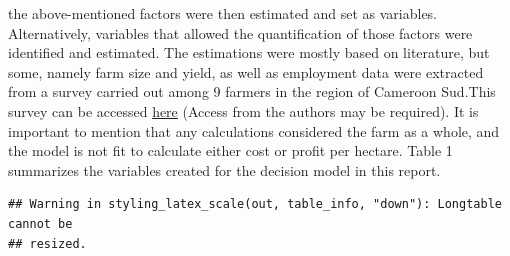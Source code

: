 \documentclass[
]{article}
\begin{document}
the above-mentioned factors were then estimated and set as variables.
Alternatively, variables that allowed the quantification of those
factors were identified and estimated. The estimations were mostly based
on literature, but some, namely farm size and yield, as well as
employment data were extracted from a survey carried out among 9 farmers
in the region of Cameroon Sud.This survey can be accessed
\href{https://docs.google.com/forms/d/1HqvVWuC2wZQChxLh2Mdu3DbTOk21pJ9Ffn6OML-6epw/edit\#responses}{here}
(Access from the authors may be required). It is important to mention
that any calculations considered the farm as a whole, and the model is
not fit to calculate either cost or profit per hectare. Table 1
summarizes the variables created for the decision model in this report.

\newpage

\begin{verbatim}
## Warning in styling_latex_scale(out, table_info, "down"): Longtable cannot be
## resized.
\end{verbatim}
\end{document}
